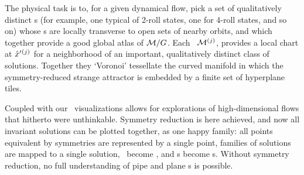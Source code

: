 The physical task is to, for a given dynamical flow, pick a set of
qualitatively distinct {\template s} (for example, one typical of 2-roll
states, one for 4-roll states, and so on) whose \slice s  are locally
transverse to open sets of nearby orbits, and which together provide a
good global atlas of ${\cal M}/G$. Each \slice\ ${\cal M}{}^{(j)}$, provides a
local chart at ${\hat{x}'}{}^{(j)}$ for a neighborhood of an important,
qualitatively distinct class of solutions. Together they `Voronoi'
tessellate  the curved manifold in which the symmetry-reduced strange
attractor is embedded by a finite set of hyperplane tiles.

Coupled with our \statesp\ visualizations allows for explorations of
high-dimensional flows that hitherto were unthinkable. Symmetry reduction
is here achieved, and now all invariant solutions can be plotted
together, as one happy family: all points equivalent by symmetries are
represented by a single point, families of solutions are mapped to a
single solution, \reqva\ become \eqva, and \rpo s become \po s. Without
symmetry reduction, no full understanding of pipe and plane \pCf s is
possible.


